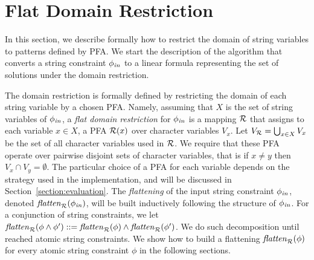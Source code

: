 \documentclass[sigplan,review,anonymous]{acmart}\settopmatter{printfolios=true,printccs=false,printacmref=false}
\begin{document}
%	
%	
%	
%
%

\section{Flat Domain Restriction}
\label{section:under_approximate}

%
In this section, we describe formally how to restrict the domain of string variables to patterns defined by PFA. 
We start the description of the algorithm that converts a string constraint $\phi_{\mathit{in}}$ to a linear formula representing the set of solutions under the domain restriction.  
%

The domain restriction is formally defined by restricting the domain of each string variable by a chosen PFA. 
%
Namely, assuming that $X$ is the set of string variables of $\phi_{\mathit{in}}$,
a \emph{flat domain restriction} for $\phi_{\mathit{in}}$ is a mapping $\mathcal{R}$ that assigns to each variable $x\in X$, a PFA $\mathcal{R}(x)$ over character variables $V_x$. Let $V_{\mathcal{R}} = \bigcup_{x\in X} V_x$ be the set of all character variables used in $\mathcal{R}$.
We require that these PFA operate over pairwise disjoint sets of character variables, that is if $x\neq y$ then $V_x \cap V_y = \emptyset$.
%
The particular choice of a PFA 
for each variable depends on the strategy used in the implementation, and will be discussed in Section~\ref{section:evaluation}.
%
The \emph{flattening} of the input string constraint $\phi_{\mathit{in}}$, denoted $\mathit{flatten}_{\mathcal{R}}(\phi_{\mathit{in}})$, will be built inductively following the structure of $\phi_{\mathit{in}}$.
For a conjunction of string constraints, we let $\mathit{flatten}_{\mathcal{R}}(\phi \land \phi') ::= \mathit{flatten}_{\mathcal{R}}(\phi) \land \mathit{flatten}_{\mathcal{R}}(\phi')$. We do such decomposition until reached atomic string constraints. We show how to build a flattening $\mathit{flatten}_{\mathcal{R}}(\phi)$ for every atomic string constraint $\phi$ in the following sections.
\end{document}
